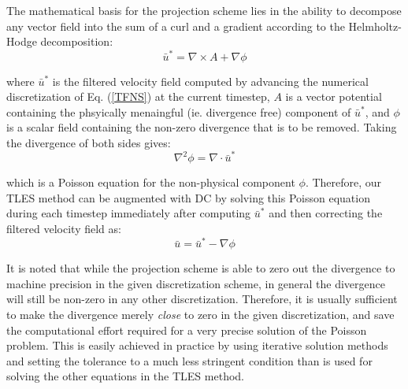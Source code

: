 The mathematical basis for the projection scheme lies in the ability to decompose any vector field into the sum of a curl and a gradient according to the Helmholtz-Hodge decomposition:
\begin{equation}
\bar{u}^*=\nabla\times A+\nabla\phi
\end{equation}

where $\bar{u}^*$ is the filtered velocity field computed by advancing the numerical discretization of Eq. (\ref{TFNS}) at the current timestep, $A$ is a vector potential containing the phsyically menaingful (ie. divergence free) component of $\bar{u}^*$, and $\phi$ is a scalar field containing the non-zero divergence that is to be removed. Taking the divergence of both sides gives:
\begin{equation} \label{eq:poisson}
\nabla^2 \phi=\nabla\cdot\bar{u}^*
\end{equation}

which is a Poisson equation for the non-physical component $\phi$. Therefore, our TLES method can be augmented with DC by solving this Poisson equation during each timestep immediately after computing $\bar{u}^*$ and then correcting the filtered velocity field as:
\begin{equation}
\bar{u}=\bar{u}^*-\nabla\phi
\end{equation}

It is noted that while the projection scheme is able to zero out the divergence to machine precision in the given discretization scheme, in general the divergence will still be non-zero in any other discretization. Therefore, it is usually sufficient to make the divergence merely \emph{close} to zero in the given discretization, and save the computational effort required for a very precise solution of the Poisson problem. This is easily achieved in practice by using iterative solution methods and setting the tolerance to a much less stringent condition than is used for solving the other equations in the TLES method.
